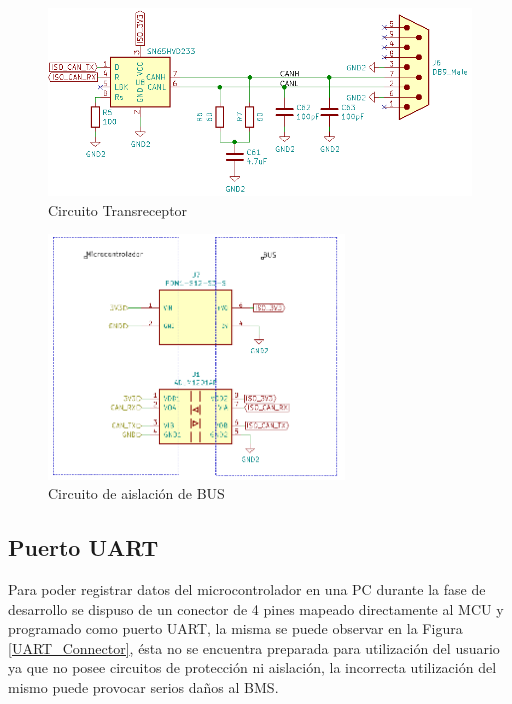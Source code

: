 \documentclass[10pt, a4paper]{report}
\begin{document}
\begin{figure}[h!]
	\begin{center}
		\includegraphics[width=1\textwidth]{SN65HVD233_circuit.png}
		\caption{Circuito Transreceptor}
		\label{can_transreceiver}
	\end{center}
\end{figure}
\FloatBarrier

\begin{figure}[h!]
	\begin{center}
		\includegraphics[width=0.70\textwidth]{isolation_CAN.png}
		\caption{Circuito de aislación de BUS}
		\label{Isolation_CAN}
	\end{center}
\end{figure}
\FloatBarrier

\subsection{Puerto UART}
Para poder registrar datos del microcontrolador en una PC durante la fase de 
desarrollo se dispuso de un conector de 4 pines mapeado directamente al
\acrshort{MCU} y programado como puerto UART, la misma se puede observar en la 
Figura \ref{UART_Connector}, \'esta no se encuentra preparada para utilización 
del usuario ya que no posee circuitos de protección ni aislación, la incorrecta 
utilización del mismo puede provocar serios daños al \acrshort{BMS}.
\end{document}
